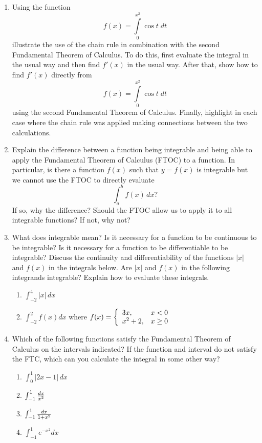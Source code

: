 \begin{enumerate}
\item   Using the function $$f(x) = \int\limits_0^{x^2 } {\cos t\;dt} $$ illustrate the use of the chain rule in combination with the second Fundamental Theorem of Calculus.  To do this, first evaluate the integral in the usual way and then find $f'(x)$ in the usual way.  After that, show how to find $f'(x)$ directly from $$f(x) = \int\limits_0^{x^2 } {\cos t\;dt} $$ using the second Fundamental Theorem of Calculus.  Finally, highlight in each case where the chain rule was applied making connections between the two calculations.

\item   Explain the difference between a function being integrable and being able to apply the Fundamental Theorem of Calculus (FTOC) to a function.  In particular, is there a function $f(x)$ such that $y = f(x)$ is integrable but we cannot use the FTOC to directly evaluate $$\int_a^b {f(x)\,dx} ?$$  If so, why the difference?  Should the FTOC allow us to apply it to all integrable functions?  If not, why not?

\item   What does integrable mean?  Is it necessary for a function to be continuous to be integrable?  Is it necessary for a function to be differentiable to be integrable?  Discuss the continuity and differentiability of the functions ${\left| x \right|}$ and $f(x)$ in the integrals below.  Are ${\left| x \right|}$ and $f(x)$ in the following integrands integrable?  Explain how to evaluate these integrals.
\begin{enumerate}
\item $\int_{ - 2}^4 {\left| x \right|\,dx} $ 
\item $\int_{ - 2}^2 {f(x)dx} $ 
	where 
		$f(x) = \left\{ \begin{array}{ll}  3x, & x < 0 \cr   x^2  + 2, & x \ge 0 \cr \end{array} \right.$
\end{enumerate}

\item   Which of the following functions satisfy the Fundamental Theorem of Calculus on the intervals indicated?  If the function and interval do not satisfy the FTC, which can you calculate the integral in some other way?  
\begin{enumerate}\item $\int_0^1 {\left| {2x - 1} \right|\,dx} $ \item $\int_{ - 1}^1 {{{dx} \over {x^2 }}} $ \item $\int_{ - 1}^1 {{{dx} \over {1 + x^2 }}} $ \item $\int_{ - 1}^1 {e^{ - x^2 } dx} $ \end{enumerate}


\end{enumerate}
